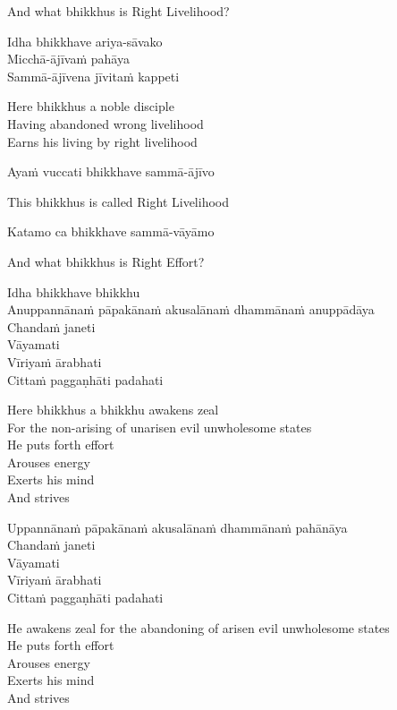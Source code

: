 \begin{english}
  And what bhikkhus is Right Livelihood?
\end{english}

Idha bhikkhave ariya-sāvako\\
Micchā-ājīvaṁ pahāya\\
Sammā-ājīvena jīvitaṁ kappeti

\begin{english-verses}
  Here bhikkhus a noble disciple\\
  Having abandoned wrong livelihood\\
  Earns his living by right livelihood
\end{english-verses}

Ayaṁ vuccati bhikkhave sammā-ājīvo

\begin{english}
  This bhikkhus is called Right Livelihood
\end{english}

Katamo ca bhikkhave sammā-vāyāmo

\begin{english}
  And what bhikkhus is Right Effort?
\end{english}

Idha bhikkhave bhikkhu\\
Anuppannānaṁ pāpakānaṁ akusalānaṁ dhammānaṁ anuppādāya\\
Chandaṁ janeti\\
Vāyamati\\
Vīriyaṁ ārabhati\\
Cittaṁ paggaṇhāti padahati

\begin{english-verses}
  Here bhikkhus a bhikkhu awakens zeal\\
  For the non-arising of unarisen evil unwholesome states\\
  He puts forth effort\\
  Arouses energy\\
  Exerts his mind\\
  And strives
\end{english-verses}

Uppannānaṁ pāpakānaṁ akusalānaṁ dhammānaṁ pahānāya\\
Chandaṁ janeti\\
Vāyamati\\
Vīriyaṁ ārabhati\\
Cittaṁ paggaṇhāti padahati

\begin{english-verses}
  He awakens zeal for the abandoning of arisen evil unwholesome states\\
  He puts forth effort\\
  Arouses energy\\
  Exerts his mind\\
  And strives
\end{english-verses}

